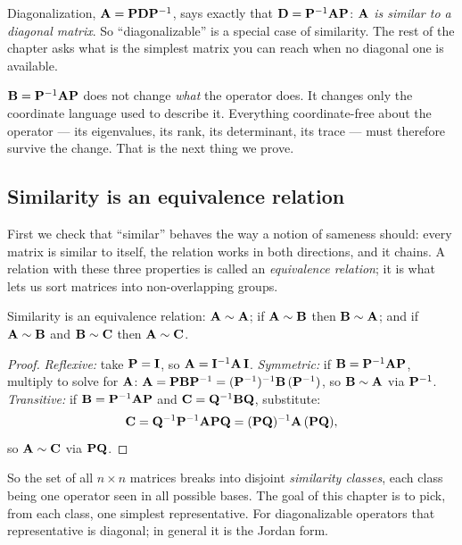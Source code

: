 Diagonalization, $\mathbf{A}=\mathbf{P}\mathbf{D}\mathbf{P}^{-1}$, says exactly that
$\mathbf{D}=\mathbf{P}^{-1}\mathbf{A}\mathbf{P}$: \emph{$\mathbf{A}$ is similar to a diagonal
matrix}. So ``diagonalizable'' is a special case of similarity. The rest of the
chapter asks what is the simplest matrix you can reach when no diagonal one is available.

\begin{focusbox}
$\mathbf{B}=\mathbf{P}^{-1}\mathbf{A}\mathbf{P}$ does not change \emph{what} the operator does. It
changes only the coordinate language used to describe it. Everything coordinate-free
about the operator --- its eigenvalues, its rank, its determinant, its trace --- must
therefore survive the change. That is the next thing we prove.
\end{focusbox}

\subsection{Similarity is an equivalence relation}

First we check that ``similar'' behaves the way a notion of sameness should: every
matrix is similar to itself, the relation works in both directions, and it chains. A
relation with these three properties is called an \emph{equivalence relation}; it is what
lets us sort matrices into non-overlapping groups.

\begin{proposition}
\label{ch28:equiv}
Similarity is an equivalence relation: $\mathbf{A}\sim\mathbf{A}$; if $\mathbf{A}\sim\mathbf{B}$ then
$\mathbf{B}\sim\mathbf{A}$; and if $\mathbf{A}\sim\mathbf{B}$ and $\mathbf{B}\sim\mathbf{C}$ then
$\mathbf{A}\sim\mathbf{C}$.
\end{proposition}

\begin{proof}
\emph{Reflexive:} take $\mathbf{P}=\mathbf{I}$, so $\mathbf{A}=\mathbf{I}^{-1}\mathbf{A}\,\mathbf{I}$.
\emph{Symmetric:} if $\mathbf{B}=\mathbf{P}^{-1}\mathbf{A}\mathbf{P}$, multiply to solve for $\mathbf{A}$:
$\mathbf{A}=\mathbf{P}\mathbf{B}\mathbf{P}^{-1}=(\mathbf{P}^{-1})^{-1}\mathbf{B}\,(\mathbf{P}^{-1})$, so
$\mathbf{B}\sim\mathbf{A}$ via $\mathbf{P}^{-1}$. \emph{Transitive:} if
$\mathbf{B}=\mathbf{P}^{-1}\mathbf{A}\mathbf{P}$ and $\mathbf{C}=\mathbf{Q}^{-1}\mathbf{B}\mathbf{Q}$, substitute:
\[
\mathbf{C}=\mathbf{Q}^{-1}\mathbf{P}^{-1}\mathbf{A}\mathbf{P}\mathbf{Q}=(\mathbf{P}\mathbf{Q})^{-1}\mathbf{A}\,(\mathbf{P}\mathbf{Q}),
\]
so $\mathbf{A}\sim\mathbf{C}$ via $\mathbf{P}\mathbf{Q}$.
\end{proof}

So the set of all $n\times n$ matrices breaks into disjoint \emph{similarity classes},
each class being one operator seen in all possible bases. The goal of this chapter
is to pick, from each class, one simplest representative. For diagonalizable operators
that representative is diagonal; in general it is the Jordan form.


